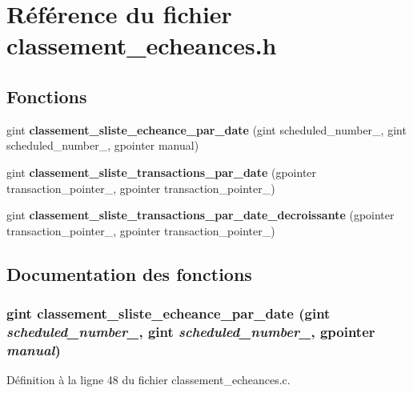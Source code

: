 \section{Référence du fichier classement\_\-echeances.h}
\label{classement__echeances_8h}
\subsection*{Fonctions}
\begin{DoxyCompactItemize}
\item 
gint {\bf classement\_\-sliste\_\-echeance\_\-par\_\-date} (gint scheduled\_\-number\_, gint scheduled\_\-number\_, gpointer manual)
\item 
gint {\bf classement\_\-sliste\_\-transactions\_\-par\_\-date} (gpointer transaction\_\-pointer\_, gpointer transaction\_\-pointer\_)
\item 
gint {\bf classement\_\-sliste\_\-transactions\_\-par\_\-date\_\-decroissante} (gpointer transaction\_\-pointer\_, gpointer transaction\_\-pointer\_)
\end{DoxyCompactItemize}


\subsection{Documentation des fonctions}
\subsubsection[{classement\_\-sliste\_\-echeance\_\-par\_\-date}]{\setlength{\rightskip}{0pt plus 5cm}gint classement\_\-sliste\_\-echeance\_\-par\_\-date (gint {\em scheduled\_\-number\_}, \/  gint {\em scheduled\_\-number\_}, \/  gpointer {\em manual})}\label{classement__echeances_8h_af017713fbadf31f7b537329b389515d1}


Définition à la ligne 48 du fichier classement\_\-echeances.c.

